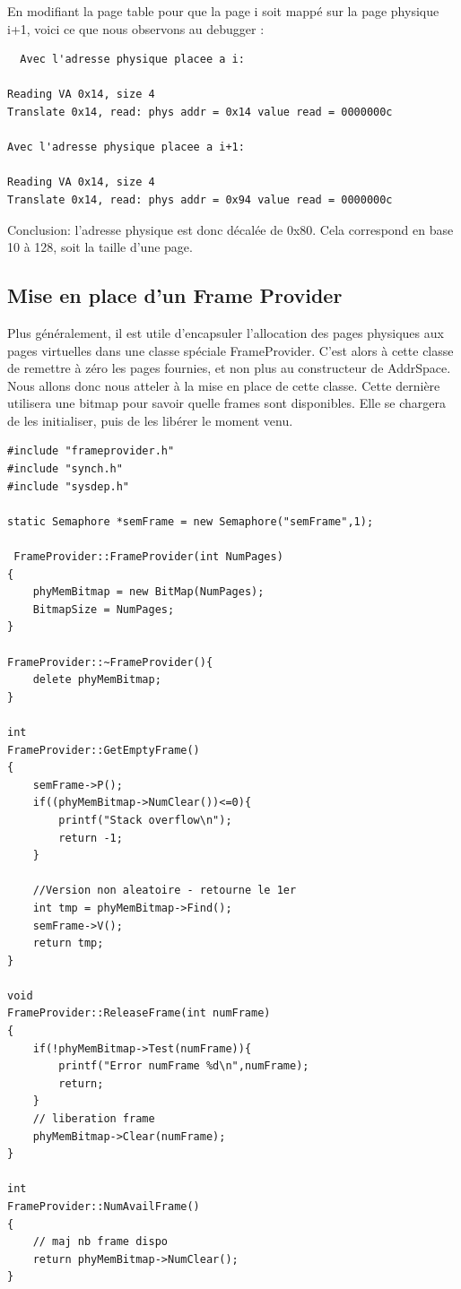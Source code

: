 \documentclass[a4paper,10pt]{article}
\begin{document}
En modifiant la page table pour que la page i soit mappé sur la page physique i+1, voici ce que nous observons au debugger :

\begin{verbatim}
  Avec l'adresse physique placee a i:

Reading VA 0x14, size 4
Translate 0x14, read: phys addr = 0x14 value read = 0000000c

Avec l'adresse physique placee a i+1:

Reading VA 0x14, size 4
Translate 0x14, read: phys addr = 0x94 value read = 0000000c
\end{verbatim}

\vspace{0.5cm}

Conclusion: l'adresse physique est donc décalée de 0x80. Cela correspond en base 10 à 128, soit la taille d'une page.

\newpage
\subsection{Mise en place d'un Frame Provider}
Plus généralement, il est utile d’encapsuler l’allocation des pages physiques aux pages virtuelles dans une
classe spéciale FrameProvider. C’est alors à cette classe de remettre à zéro les pages fournies, et
non plus au constructeur de AddrSpace. Nous allons donc nous atteler à la mise en place de cette classe.
Cette dernière utilisera une bitmap  pour savoir quelle frames sont disponibles. Elle se chargera de les initialiser, puis de les libérer le moment venu.

\begin{lstlisting}[frame=single]
#include "frameprovider.h"
#include "synch.h"
#include "sysdep.h"

static Semaphore *semFrame = new Semaphore("semFrame",1);

 FrameProvider::FrameProvider(int NumPages)
{
	phyMemBitmap = new BitMap(NumPages);
	BitmapSize = NumPages;
}

FrameProvider::~FrameProvider(){
	delete phyMemBitmap;
}

int
FrameProvider::GetEmptyFrame()
{
	semFrame->P();
	if((phyMemBitmap->NumClear())<=0){
		printf("Stack overflow\n");
		return -1;
	}

	//Version non aleatoire - retourne le 1er
	int tmp = phyMemBitmap->Find();
	semFrame->V();
	return tmp;
}

void
FrameProvider::ReleaseFrame(int numFrame)
{
	if(!phyMemBitmap->Test(numFrame)){
		printf("Error numFrame %d\n",numFrame);
		return;
	}
	// liberation frame
	phyMemBitmap->Clear(numFrame);
}

int
FrameProvider::NumAvailFrame()
{
	// maj nb frame dispo
	return phyMemBitmap->NumClear();
}
\end{lstlisting}
\end{document}
